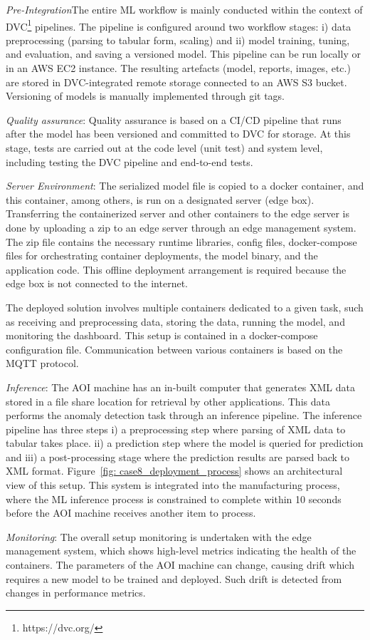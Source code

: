 \textit{Pre-Integration}The entire ML workflow is mainly conducted within the context of DVC\footnote{https://dvc.org/} pipelines. The pipeline is configured around two workflow stages: i) data preprocessing (parsing to tabular form, scaling) and ii) model training, tuning, and evaluation, and saving a versioned model. This pipeline can be run locally or in an AWS EC2 instance. The resulting artefacts (model, reports, images, etc.) are stored in DVC-integrated remote storage connected to an AWS S3 bucket. Versioning of models is manually implemented through git tags.

\textit{Quality assurance}: Quality assurance is based on a CI/CD pipeline that runs after the model has been versioned and committed to DVC for storage. At this stage, tests are carried out at the code level (unit test) and system level, including testing the DVC pipeline and end-to-end tests.

\textit{Server Environment}: The serialized model file is copied to a docker container, and this container, among others, is run on a designated server (edge box). Transferring the containerized server and other containers to the edge server is done by uploading a zip to an edge server through an edge management system. The zip file contains the necessary runtime libraries, config files, docker-compose files for orchestrating container deployments, the model binary, and the application code. This offline deployment arrangement is required because the edge box is not connected to the internet.

The deployed solution involves multiple containers dedicated to a given task, such as receiving and preprocessing data, storing the data, running the model, and monitoring the dashboard. This setup is contained in a docker-compose configuration file. Communication between various containers is based on the MQTT protocol. 

\textit{Inference}: The AOI machine has an in-built computer that generates XML data stored in a file share location for retrieval by other applications. This data performs the anomaly detection task through an inference pipeline. The inference pipeline has three steps i) a preprocessing step where parsing of XML data to tabular takes place. ii) a prediction step where the model is queried for prediction and iii) a post-processing stage where the prediction results are parsed back to XML format. Figure~\ref{fig: case8_deployment_process} shows an architectural view of this setup. This system is integrated into the manufacturing process, where the ML inference process is constrained to complete within 10 seconds before the AOI machine receives another item to process.

\textit{Monitoring}: The overall setup monitoring is undertaken with the edge management system, which shows high-level metrics indicating the health of the containers. The parameters of the AOI machine can change, causing drift which requires a new model to be trained and deployed. Such drift is detected from changes in performance metrics.
